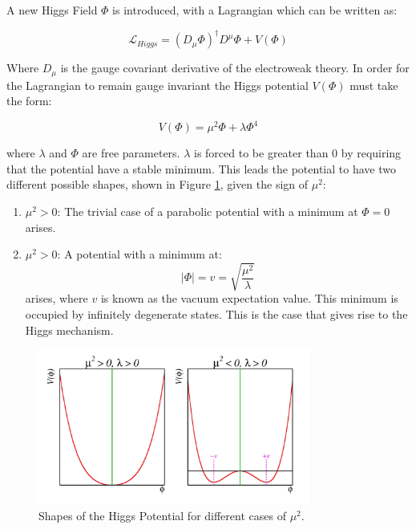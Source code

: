 A new Higgs Field $\Phi$ is introduced, with a Lagrangian which can be written as:

\begin{equation}
\mathcal{L}_{Higgs} = (D_{\mu}\Phi)^{\dagger}D^{\mu}\Phi + V(\Phi)
\end{equation}

Where $D_{\mu}$ is the gauge covariant derivative of the electroweak theory. In order for the Lagrangian to remain gauge invariant the Higgs potential $V(\Phi)$ must take the form:

\begin{equation}
    V(\Phi) = {\mu}^2{\Phi} + {\lambda}{\Phi}^4
\end{equation}

where $\lambda$ and $\Phi$ are free parameters. $\lambda$ is forced to be greater than 0 by requiring that the potential have a stable minimum. This leads the potential to have two different possible shapes, shown in Figure \ref{fig:higgspot}, given the sign of $\mu^2$:

\begin{enumerate}
    \item ${\mu^2 > 0}$: The trivial case of a parabolic potential with a minimum at $\Phi = 0$ arises.
    \item ${\mu^2 > 0}$: A potential with a minimum at:
    \begin{equation}
     |\Phi| = v = \sqrt{\frac{\mu^2}{\lambda}}
    \end{equation}
     arises, where $v$ is known as the vacuum expectation value. This minimum is occupied by infinitely degenerate states. This is the case that gives rise to the Higgs mechanism.
\end{enumerate}

\begin{figure}[h]
    \centering
    \includegraphics[width=0.8\textwidth]{Figures/1/HiggsPotential.png}
    \caption{Shapes of the Higgs Potential for different cases of $\mu^2$.}
    \label{fig:higgspot}
\end{figure}

